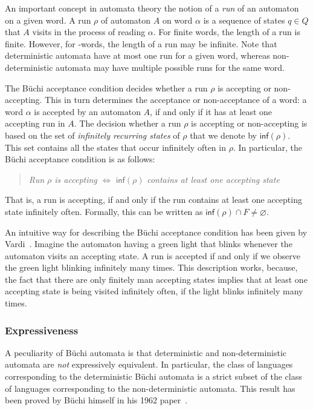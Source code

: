 An important concept in automata theory the notion of a \textit{run} of an automaton on a given word. A run $\rho$ of automaton $A$ on word $\alpha$ is a sequence of states $q \in Q$ that $A$ visits in the process of reading $\alpha$. For finite words, the length of a run is finite. However, for \om-words, the length of a run may be infinite. Note that deterministic automata have at most one run for a given word, whereas non-deterministic automata may have multiple possible runs for the same word.

The Büchi acceptance condition decides whether a run $\rho$ is accepting or non-accepting. This in turn determines the acceptance or non-acceptance of a word: a word $\alpha$ is accepted by an automaton $A$, if and only if it has at least one accepting run in $A$. The decision whether a run $\rho$ is accepting or non-accepting is based on the set of \textit{infinitely recurring states} of $\rho$ that we denote by $\textsf{inf}(\rho)$. This set contains all the states that occur infinitely often in $\rho$. In particular, the Büchi acceptance condition is as follows:

\begin{quote}
\centering
\textit{Run $\rho$ is accepting} $\Longleftrightarrow$ $\textsf{inf}(\rho)$ \textit{contains at least one accepting state}
\end{quote}

That is, a run is accepting, if and only if the run contains at least one accepting state infinitely often. Formally, this can be written as $\textsf{inf}(\rho) \cap F \neq \varnothing$. 

An intuitive way for describing the Büchi acceptance condition has been given by Vardi~\cite{1996_vardi}. Imagine the automaton having a green light that blinks whenever the automaton visits an accepting state. A run is accepted if and only if we observe the green light blinking infinitely many times. This description works, because, the fact that there are only finitely man accepting states implies that at least one accepting state is being visited infinitely often, if the light blinks infinitely many times.

\subsubsection{Expressiveness}
A peculiarity of Büchi automata is that deterministic and non-deterministic automata are \textit{not} expressively equivalent. In particular, the class of languages corresponding to the deterministic Büchi automata is a strict subset of the class of languages corresponding to the non-deterministic automata. This result has been proved by Büchi himself in his 1962 paper~\cite{buchi1960decision}.

